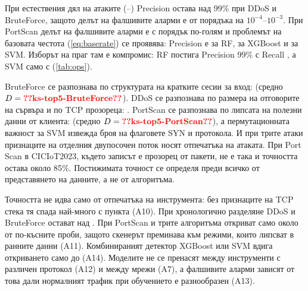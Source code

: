 \begin{keybox}
При естествения дял на атаките (--) Precision остава над 99\% при DDoS и BruteForce, защото делът на фалшивите аларми е от порядъка на $10^{-4}$--$10^{-3}$. При PortScan делът на фалшивите аларми е с порядък по-голям и проблемът на базовата честота (\cref{eq:baserate}) се проявява: Precision е  за RF,  за XGBoost и  за SVM. Изборът на праг там е компромис: RF постига Precision 99\% с Recall , а SVM само с  (\cref{tab:ops}).
\end{keybox}

\begin{keybox}
BruteForce се разпознава по структурата на кратките сесии за вход:  (средно $D=\val{ks-top5-BruteForce}$). DDoS се разпознава по размера на отговорите на сървъра и по TCP прозореца: . PortScan се разпознава по липсата на полезни данни от клиента:  (средно $D=\val{ks-top5-PortScan}$), а пермутационната важност за SVM извежда броя на флаговете SYN и протокола. И при трите атаки признаците на отделния двупосочен поток носят отпечатъка на атаката. При Port Scan в CICIoT2023, където записът е прозорец от пакети, не е така и точността остава около 85\%. Постижимата точност се определя преди всичко от представянето на данните, а не от алгоритъма.
\end{keybox}

\begin{keybox}
Точността не идва само от отпечатъка на инструмента: без признаците на TCP стека тя спада най-много с  пункта (A10). При хронологично разделяне DDoS и BruteForce остават над . При PortScan и трите алгоритъма откриват само около  от по-късните проби, защото скенерът преминава към режими, които липсват в ранните данни (A11). Комбинираният детектор XGBoost или SVM вдига откриването само до  (A14). Моделите не се пренасят между инструменти с различен протокол (A12) и между мрежи (A7), а фалшивите аларми зависят от това дали нормалният трафик при обучението е разнообразен (A13).
\end{keybox}

